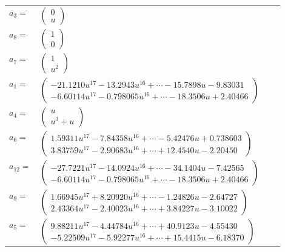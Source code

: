 \documentclass[1p]{elsarticle_modified}
\theoremstyle{definition}
\begin{document}
\begin{tabular}{m{7pt} m{180pt} m{7pt} m{180pt} }
\flushright $a_{3}=$&$\begin{pmatrix}0\\u\end{pmatrix}$ \\
\flushright $a_{8}=$&$\begin{pmatrix}1\\0\end{pmatrix}$ \\
\flushright $a_{7}=$&$\begin{pmatrix}1\\u^2\end{pmatrix}$ \\
\flushright $a_{1}=$&$\begin{pmatrix}-21.1210 u^{17}-13.2943 u^{16}+\cdots-15.7898 u-9.83031\\-6.60114 u^{17}-0.798065 u^{16}+\cdots-18.3506 u+2.40466\end{pmatrix}$ \\
\flushright $a_{4}=$&$\begin{pmatrix}u\\u^3+u\end{pmatrix}$ \\
\flushright $a_{6}=$&$\begin{pmatrix}1.59311 u^{17}-7.84358 u^{16}+\cdots-5.42476 u+0.738603\\3.83759 u^{17}-2.90683 u^{16}+\cdots+12.4540 u-2.20450\end{pmatrix}$ \\
\flushright $a_{12}=$&$\begin{pmatrix}-27.7221 u^{17}-14.0924 u^{16}+\cdots-34.1404 u-7.42565\\-6.60114 u^{17}-0.798065 u^{16}+\cdots-18.3506 u+2.40466\end{pmatrix}$ \\
\flushright $a_{9}=$&$\begin{pmatrix}1.66945 u^{17}+8.20920 u^{16}+\cdots-1.24826 u-2.64727\\2.43364 u^{17}-2.40023 u^{16}+\cdots+3.84227 u-3.10022\end{pmatrix}$ \\
\flushright $a_{5}=$&$\begin{pmatrix}9.88211 u^{17}-4.44784 u^{16}+\cdots+40.9123 u-4.55430\\-5.22509 u^{17}-5.92277 u^{16}+\cdots+15.4415 u-6.18370\end{pmatrix}$ \\

\end{tabular}
\end{document}

